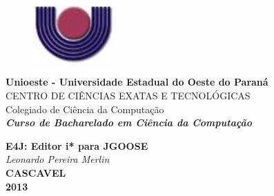 \begin{figure}
	\centering
	\includegraphics[width = 3.13cm, height = 2.19cm]{Figuras/Simbolo.jpg}
\end{figure}
\fontsize{13}{13}
\noindent
\textbf{Unioeste - Universidade Estadual do Oeste do Paran\'{a}}\\
\fontsize{11}{11}
CENTRO DE CI\^{E}NCIAS EXATAS E TECNOL\'{O}GICAS\\
Colegiado de Ci\^{e}ncia da Computa\c{c}\~{a}o\\
\textbf{\textit{Curso de Bacharelado em Ci\^{e}ncia da Computa\c{c}\~{a}o}}
\vspace{9cm}
\begin{center}
\fontsize{13}{13}
\textbf{E4J: Editor i* para JGOOSE}\\
\vspace{0.3cm}
\textit{Leonardo Pereira Merlin}\\
\vspace{9cm}
\textbf{CASCAVEL}\\
\textbf{2013}
\end{center}
